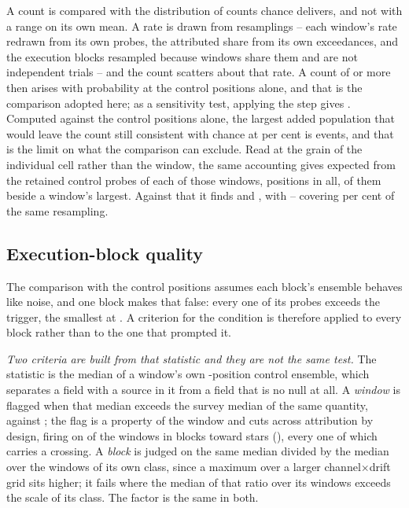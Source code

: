 A count is compared with the distribution of counts chance delivers, and
not with a range on its own mean. A rate is drawn from \CeNBoot{} resamplings
-- each window's rate redrawn from its own \NCtrl{} probes, the attributed
share from its own \CeNExc{} exceedances, and the execution blocks resampled
because windows share them and are not independent trials -- and the count
scatters about that rate. A count of \CeObs{} or more then arises with
probability \CeProbNull{} at the control positions alone, and that is the
comparison adopted here; as a sensitivity test, applying the step gives
\CeProbStep. Computed against the control positions alone, the largest added
population that would leave the count still consistent with chance at
\CeCovPct{} per cent is \CeAddLim{} events, and
that is the limit on what the comparison can exclude. Read at the grain of
the individual cell rather than the window, the same accounting gives
\CkExp{} expected from the \CkNCtrlPerWin{} retained control probes of each
of those \CkNWin{} windows, \CkNCtrlPos{} positions in all, \CkExpSec{}
of them beside a window's largest. Against that it finds \CkNObs{} and
\CkNSecUnattr, with \CkLo--\CkHi{} covering \CeCovPct{} per cent of the same
resampling.

\subsection{Execution-block quality}
\label{sec:blockquality}

The comparison with the control positions assumes each block's ensemble
behaves like noise, and one block makes that false: every one of its \NCtrl{}
probes exceeds the trigger, the smallest at \BqFailCtrlMin. A criterion for
the condition is therefore applied to every block rather than to the one that
prompted it.

\emph{Two criteria are built from that statistic and they are not the same
test.} The statistic is the median of a window's own \NCtrl-position control
ensemble, which separates a field with a source in it from a field that is no
null at all. A \emph{window} is flagged when that median exceeds \BqFactor{}
the survey median of the same quantity, \DqThresh{} against \DqSurvMed; the
flag is a property of the window and cuts across attribution by design,
firing on \DqNWin{} of the \NWindows{} windows in \BkFlagNBlock{} blocks
toward \DqNStar{} stars (\DqStars), every one of which carries a crossing.
A \emph{block} is judged on the same median divided by the median over the
windows of its own class, since a maximum over a larger channel$\times$drift
grid sits higher; it fails where the median of that ratio over its windows
exceeds \BqFactor{} the scale of its class. The factor is the same in both.

